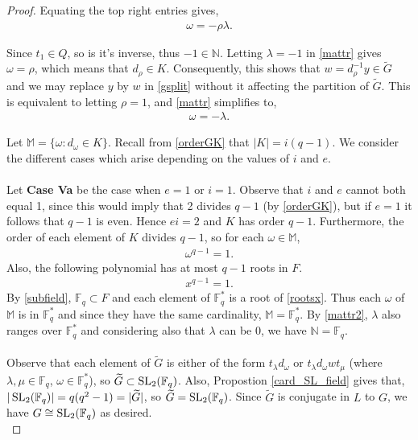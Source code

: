 \begin{proof}
Equating the top right entries gives,
\begin{align}\label{mattr} \omega = -\rho \lambda.
\end{align}

Since $t_1 \in Q$, so is it's inverse, thus $-1 \in \mathbb{N}$. Letting $\lambda = -1$ in \eqref{mattr} gives $\omega = \rho$, which means that $d_\rho \in K$. Consequently, this shows that $w = d_\rho^{-1} y \in {\widetilde{G}}$ and we may replace $y$ by $w$ in \eqref{gsplit} without it affecting the partition of ${\widetilde{G}}$. This is equivalent to letting $\rho = 1$, and \eqref{mattr} simplifies to,
\begin{align}\label{mattr2} \omega = -\lambda.
\end{align}

Let $\mathbb{M} = \{ \omega : d_\omega \in K \}$. Recall from \eqref{orderGK} that $|K| = i(q-1)$. We consider the different cases which arise depending on the values of $i$ and $e$. \\
\\
Let \textbf{Case Va} be the case when $e=1$ or $i = 1$. Observe that $i$ and $e$ cannot both equal 1, since this would imply that 2 divides $q-1$ (by \eqref{orderGK}), but if $e=1$ it follows that $q-1$ is even. Hence $ei = 2$ and $K$ has order $q-1$. Furthermore, the order of each element of $K$ divides $q-1$, so for each $\omega \in \mathbb{M}$,
\begin{align}
    \label{roots} \omega^{q-1} = 1.
\end{align}
Also, the following polynomial has at most $q-1$ roots in $F$.
\begin{align}\label{rootsx} x^{q-1} = 1.
\end{align}
By \eqref{subfield}, $\mathbb{F}_q \subset F$ and each element of $\mathbb{F}^*_q$ is a root of \eqref{rootsx}. Thus each $\omega$ of $\mathbb{M}$ is in $\mathbb{F}^*_q$ and since they have the same cardinality, $\mathbb{M} = \mathbb{F}^*_q$. By \eqref{mattr2}, $\lambda$ also ranges over $\mathbb{F}^*_q$ and considering also that $\lambda$ can be 0, we have $\mathbb{N} =\mathbb{F}_q$. \\
\\
Observe that each element of ${\widetilde{G}}$ is either of the form $t_\lambda d_\omega$ or $t_\lambda d_\omega w t_\mu$ (where $\lambda, \mu \in \mathbb{F}_q$, $\omega \in \mathbb{F}^*_q$), so ${\widetilde{G}} \subset \operatorname{SL}_2(\mathbb{F}_q)$. Also, Propostion \ref{card_SL_field} gives that, $|\operatorname{SL}_2(\mathbb{F}_q)| = q(q^2-1) = |{\widetilde{G}}|$, so ${\widetilde{G}} = \operatorname{SL}_2(\mathbb{F}_q)$. Since ${\widetilde{G}}$ is conjugate in $L$ to $G$, we have $G \cong \operatorname{SL}_2(\mathbb{F}_q)$  as desired. \\

\end{proof}
